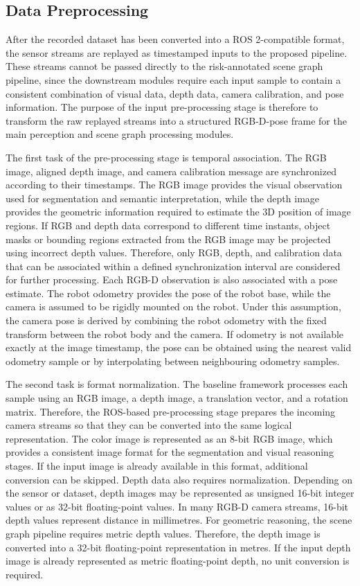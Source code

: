 \subsection{Data Preprocessing}

After the recorded dataset has been converted into a ROS 2-compatible format, the sensor streams are replayed as timestamped inputs to the proposed pipeline. These streams cannot be passed directly to the risk-annotated scene graph pipeline, since the downstream modules require each input sample to contain a consistent combination of visual data, depth data, camera calibration, and pose information. The purpose of the input pre-processing stage is therefore to transform the raw replayed streams into a structured RGB-D-pose frame for the main perception and scene graph processing modules.

The first task of the pre-processing stage is temporal association. The RGB image, aligned depth image, and camera calibration message are synchronized according to their timestamps. The RGB image provides the visual observation used for segmentation and semantic interpretation, while the depth image provides the geometric information required to estimate the 3D position of image regions. If RGB and depth data correspond to different time instants, object masks or bounding regions extracted from the RGB image may be projected using incorrect depth values. Therefore, only RGB, depth, and calibration data that can be associated within a defined synchronization interval are considered for further processing. Each RGB-D observation is also associated with a pose estimate. The robot odometry provides the pose of the robot base, while the camera is assumed to be rigidly mounted on the robot. Under this assumption, the camera pose is derived by combining the robot odometry with the fixed transform between the robot body and the camera. If odometry is not available exactly at the image timestamp, the pose can be obtained using the nearest valid odometry sample or by interpolating between neighbouring odometry samples.

The second task is format normalization. The baseline framework processes each sample using an RGB image, a depth image, a translation vector, and a rotation matrix. Therefore, the ROS-based pre-processing stage prepares the incoming camera streams so that they can be converted into the same logical representation. The color image is represented as an 8-bit RGB image, which provides a consistent image format for the segmentation and visual reasoning stages. If the input image is already available in this format, additional conversion can be skipped. Depth data also requires normalization. Depending on the sensor or dataset, depth images may be represented as unsigned 16-bit integer values or as 32-bit floating-point values. In many RGB-D camera streams, 16-bit depth values represent distance in millimetres. For geometric reasoning, the scene graph pipeline requires metric depth values. Therefore, the depth image is converted into a 32-bit floating-point representation in metres. If the input depth image is already represented as metric floating-point depth, no unit conversion is required.

